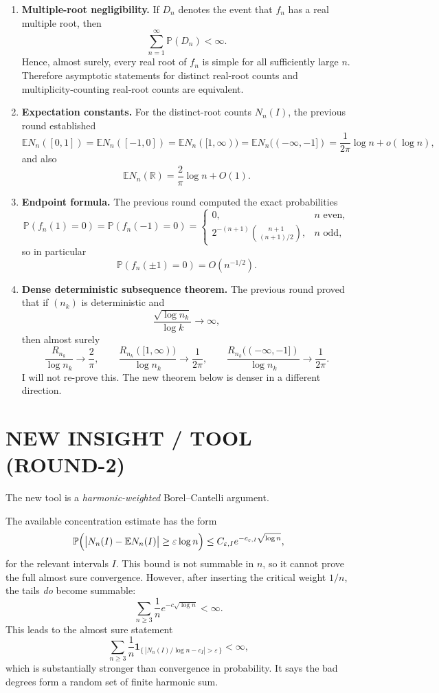 \begin{enumerate}
\item \textbf{Multiple-root negligibility.} If $D_n$ denotes the event that $f_n$ has a real multiple root, then
\[
\sum_{n=1}^{\infty}\mathbb P(D_n)<\infty.
\]
Hence, almost surely, every real root of $f_n$ is simple for all sufficiently large $n$. Therefore asymptotic statements for distinct real-root counts and multiplicity-counting real-root counts are equivalent.

\item \textbf{Expectation constants.} For the distinct-root counts $N_n(I)$, the previous round established
\[
\mathbb E N_n([0,1])
=\mathbb E N_n([-1,0])
=\mathbb E N_n([1,\infty))
=\mathbb E N_n((-\infty,-1])
=\frac{1}{2\pi}\log n+o(\log n),
\]
and also
\[
\mathbb E N_n(\mathbb R)=\frac{2}{\pi}\log n+O(1).
\]

\item \textbf{Endpoint formula.} The previous round computed the exact probabilities
\[
\mathbb P(f_n(1)=0)=\mathbb P(f_n(-1)=0)=
\begin{cases}
0,& n\text{ even},\\[3pt]
2^{-(n+1)}\binom{n+1}{(n+1)/2},& n\text{ odd},
\end{cases}
\]
so in particular
\[
\mathbb P(f_n(\pm1)=0)=O(n^{-1/2}).
\]

\item \textbf{Dense deterministic subsequence theorem.} The previous round proved that if $(n_k)$ is deterministic and
\[
\frac{\sqrt{\log n_k}}{\log k}\to\infty,
\]
then almost surely
\[
\frac{R_{n_k}}{\log n_k}\to\frac{2}{\pi},
\qquad
\frac{R_{n_k}([1,\infty))}{\log n_k}\to\frac{1}{2\pi},
\qquad
\frac{R_{n_k}((-\infty,-1])}{\log n_k}\to\frac{1}{2\pi}.
\]
I will not re-prove this. The new theorem below is denser in a different direction.
\end{enumerate}

\section{NEW INSIGHT / TOOL (ROUND-2)}

The new tool is a \emph{harmonic-weighted} Borel--Cantelli argument.

The available concentration estimate has the form
\[
\mathbb P\Bigl(\bigl|N_n(I)-\mathbb E N_n(I)\bigr|\ge \varepsilon\log n\Bigr)
\le C_{\varepsilon,I}e^{-c_{\varepsilon,I}\sqrt{\log n}},
\]
for the relevant intervals $I$. This bound is not summable in $n$, so it cannot prove the full almost sure convergence. However, after inserting the critical weight $1/n$, the tails \emph{do} become summable:
\[
\sum_{n\ge 3}\frac{1}{n}e^{-c\sqrt{\log n}}<\infty.
\]
This leads to the almost sure statement
\[
\sum_{n\ge 3}\frac{1}{n}
\mathbf 1_{\{\,|N_n(I)/\log n-c_I|>\varepsilon\,\}}<\infty,
\]
which is substantially stronger than convergence in probability. It says the bad degrees form a random set of finite harmonic sum.

